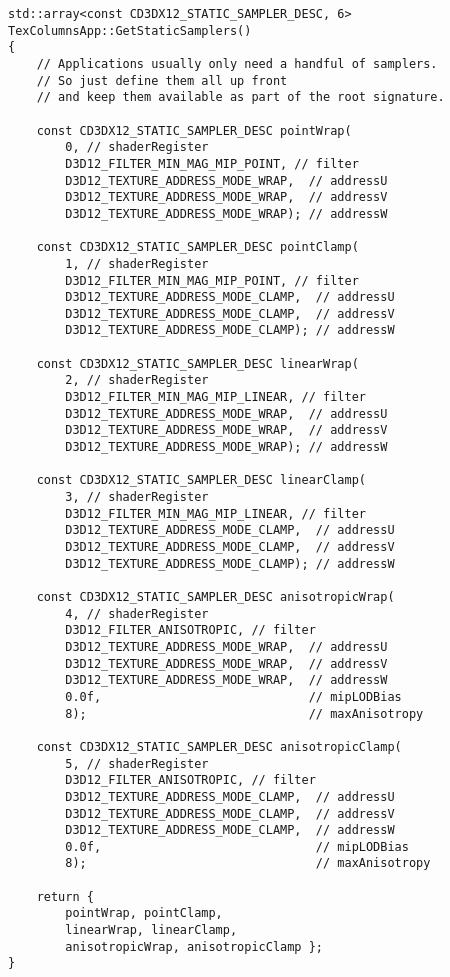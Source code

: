\begin{lstlisting}
std::array<const CD3DX12_STATIC_SAMPLER_DESC, 6> 
TexColumnsApp::GetStaticSamplers()
{
    // Applications usually only need a handful of samplers. 
    // So just define them all up front
    // and keep them available as part of the root signature.  

    const CD3DX12_STATIC_SAMPLER_DESC pointWrap(
        0, // shaderRegister
        D3D12_FILTER_MIN_MAG_MIP_POINT, // filter
        D3D12_TEXTURE_ADDRESS_MODE_WRAP,  // addressU
        D3D12_TEXTURE_ADDRESS_MODE_WRAP,  // addressV
        D3D12_TEXTURE_ADDRESS_MODE_WRAP); // addressW

    const CD3DX12_STATIC_SAMPLER_DESC pointClamp(
        1, // shaderRegister
        D3D12_FILTER_MIN_MAG_MIP_POINT, // filter
        D3D12_TEXTURE_ADDRESS_MODE_CLAMP,  // addressU
        D3D12_TEXTURE_ADDRESS_MODE_CLAMP,  // addressV
        D3D12_TEXTURE_ADDRESS_MODE_CLAMP); // addressW

    const CD3DX12_STATIC_SAMPLER_DESC linearWrap(
        2, // shaderRegister
        D3D12_FILTER_MIN_MAG_MIP_LINEAR, // filter
        D3D12_TEXTURE_ADDRESS_MODE_WRAP,  // addressU
        D3D12_TEXTURE_ADDRESS_MODE_WRAP,  // addressV
        D3D12_TEXTURE_ADDRESS_MODE_WRAP); // addressW

    const CD3DX12_STATIC_SAMPLER_DESC linearClamp(
        3, // shaderRegister
        D3D12_FILTER_MIN_MAG_MIP_LINEAR, // filter
        D3D12_TEXTURE_ADDRESS_MODE_CLAMP,  // addressU
        D3D12_TEXTURE_ADDRESS_MODE_CLAMP,  // addressV
        D3D12_TEXTURE_ADDRESS_MODE_CLAMP); // addressW

    const CD3DX12_STATIC_SAMPLER_DESC anisotropicWrap(
        4, // shaderRegister
        D3D12_FILTER_ANISOTROPIC, // filter
        D3D12_TEXTURE_ADDRESS_MODE_WRAP,  // addressU
        D3D12_TEXTURE_ADDRESS_MODE_WRAP,  // addressV
        D3D12_TEXTURE_ADDRESS_MODE_WRAP,  // addressW
        0.0f,                             // mipLODBias
        8);                               // maxAnisotropy

    const CD3DX12_STATIC_SAMPLER_DESC anisotropicClamp(
        5, // shaderRegister
        D3D12_FILTER_ANISOTROPIC, // filter
        D3D12_TEXTURE_ADDRESS_MODE_CLAMP,  // addressU
        D3D12_TEXTURE_ADDRESS_MODE_CLAMP,  // addressV
        D3D12_TEXTURE_ADDRESS_MODE_CLAMP,  // addressW
        0.0f,                              // mipLODBias
        8);                                // maxAnisotropy

    return { 
        pointWrap, pointClamp,
        linearWrap, linearClamp, 
        anisotropicWrap, anisotropicClamp };
}


\end{lstlisting}
